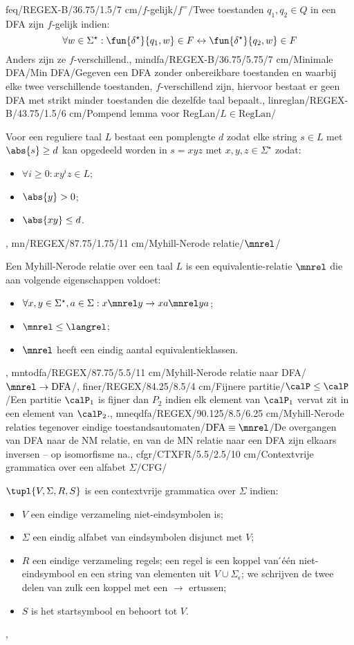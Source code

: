 feq/REGEX-B/36.75/1.5/7 cm/{$f$-gelijk}/$f^=$/{Twee toestanden $q_1,q_2\in Q$ in een DFA zijn $f$-gelijk indien:\[\forall w\in\Sigma^{\star}:\fun{\delta^{\star}}{q_1,w}\in F\leftrightarrow\fun{\delta^{\star}}{q_2,w}\in F\]Anders zijn ze $f$-verschillend.},
mindfa/REGEX-B/36.75/5.75/7 cm/{Minimale DFA}/Min DFA/{Gegeven een DFA zonder onbereikbare toestanden en waarbij elke twee verschillende toestanden, $f$-verschillend zijn, hiervoor bestaat er geen DFA met strikt minder toestanden die dezelfde taal bepaalt.},
linreglan/REGEX-B/43.75/1.5/6 cm/Pompend lemma voor RegLan/$L\in\mbox{RegLan}$/{Voor een reguliere taal $L$ bestaat een pomplengte $d$ zodat elke string $s\in L$ met $\abs{s}\geq d$ kan opgedeeld worden in $s=xyz$ met $x,y,z\in\Sigma^{\star}$ zodat:\begin{itemize}\item $\forall i\geq 0:xy^iz\in L$;\item $\abs{y}>0$;\item $\abs{xy}\leq d$.\end{itemize}},
mn/REGEX/87.75/1.75/11 cm/Myhill-Nerode relatie/$\mnrel$/{Een Myhill-Nerode relatie over een taal $L$ is een equivalentie-relatie $\mnrel$ die aan volgende eigenschappen voldoet:\begin{itemize}\item $\forall x,y\in\Sigma^{\star},a\in\Sigma:x\mnrel y\rightarrow xa\mnrel ya$;\item $\mnrel\leq\langrel$;\item $\mnrel$ heeft een eindig aantal equivalentieklassen.\end{itemize}},
mntodfa/REGEX/87.75/5.5/11 cm/Myhill-Nerode relatie naar DFA/$\mnrel\rightarrow\mbox{DFA}$/{},
finer/REGEX/84.25/8.5/4 cm/Fijnere partitie/{$\calP\leq\calP$}/{Een partitie $\calP_1$ is fijner dan $P_2$ indien elk element van $\calP_1$ vervat zit in een element van $\calP_2$.},
mneqdfa/REGEX/90.125/8.5/6.25 cm/Myhill-Nerode relaties tegenover eindige toestandsautomaten/$\mbox{DFA}\equiv\mnrel$/{De overgangen van DFA naar de NM relatie, en van de MN relatie naar een DFA zijn elkaars inversen -- op isomorfisme na.},
cfgr/CTXFR/5.5/2.5/10 cm/Contextvrije grammatica over een alfabet $\Sigma$/CFG/{$\tupl{V,\Sigma,R,S}$ is een contextvrije grammatica over $\Sigma$ indien:\begin{itemize}
 \item $V$ een eindige verzameling niet-eindsymbolen is;
 \item $\Sigma$ een eindig alfabet van eindsymbolen disjunct met $V$;
 \item $R$ een eindige verzameling regels; een regel is een koppel van  ́\'e\'en niet-eindsymbool en een string van elementen uit $V\cup\Sigma_{\epsilon}$; we schrijven de twee delen van zulk een koppel met een $\rightarrow$ ertussen;
 \item $S$ is het startsymbool en behoort tot $V$.
\end{itemize}},
